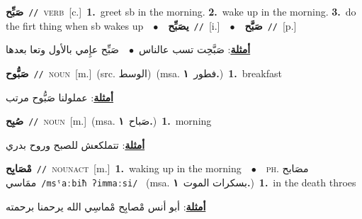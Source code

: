 \documentclass[10pt,a4paper,twoside]{article} %
\begin{document}
\begin{multicols}{2}
{{{{{\setlength\topsep{0pt}\textbf{\foreignlanguage{arabic}{صَبِّح}}\ {\color{gray}\texttt{//}\color{black}}\ \textsc{verb}\ [c.]\ \textbf{1.}~greet sb in the morning.  \textbf{2.}~wake up in the morning.  \textbf{3.}~do the firt thing when sb wakes up\ \ $\bullet$\ \ \setlength\topsep{0pt}\textbf{\foreignlanguage{arabic}{يصَبِّح}}\ {\color{gray}\texttt{//}\color{black}}\ [i.]\ \ $\bullet$\ \ \setlength\topsep{0pt}\textbf{\foreignlanguage{arabic}{صَبَّح}}\ {\color{gray}\texttt{//}\color{black}}\ [p.]\  \begin{flushright}\color{gray}\foreignlanguage{arabic}{\textbf{\underline{\foreignlanguage{arabic}{أمثلة}}}: صَبَّحِت تسب عالناس\ $\bullet$\ \  صَبِّح عإِمي بالأول وتعا بعدها}\end{flushright}\color{black}} \vspace{2mm}

{\setlength\topsep{0pt}\textbf{\foreignlanguage{arabic}{صَبُّوح}}\ {\color{gray}\texttt{//}\color{black}}\ \textsc{noun}\ [m.]\ (src. \color{gray}\foreignlanguage{arabic}{الوسط}\color{black})\ \color{gray}(msa. \foreignlanguage{arabic}{فطور}~\foreignlanguage{arabic}{\textbf{١.}})\color{black}\ \textbf{1.}~breakfast\  \begin{flushright}\color{gray}\foreignlanguage{arabic}{\textbf{\underline{\foreignlanguage{arabic}{أمثلة}}}: عملولنا صَبُّوح  مرتب}\end{flushright}\color{black}} \vspace{2mm}

{\setlength\topsep{0pt}\textbf{\foreignlanguage{arabic}{صُبِح}}\ {\color{gray}\texttt{//}\color{black}}\ \textsc{noun}\ [m.]\ \color{gray}(msa. \foreignlanguage{arabic}{صَباح}~\foreignlanguage{arabic}{\textbf{١.}})\color{black}\ \textbf{1.}~morning\  \begin{flushright}\color{gray}\foreignlanguage{arabic}{\textbf{\underline{\foreignlanguage{arabic}{أمثلة}}}: تتملكعش للصبح وروح بدري}\end{flushright}\color{black}} \vspace{2mm}

{\setlength\topsep{0pt}\textbf{\foreignlanguage{arabic}{مْصَابِح}}\ {\color{gray}\texttt{//}\color{black}}\ \textsc{noun\textunderscore act}\ [m.]\ \textbf{1.}~waking up in the morning\ \ $\bullet$\ \ \textsc{ph.} \color{gray} \foreignlanguage{arabic}{مصَابح ممَاسي}\color{black}\ {\color{gray}\texttt{/{\sffamily msˤaːbiħ ʔimmaːsi}/}\color{black}}\ \color{gray} (msa. \foreignlanguage{arabic}{بسكرات الموت}~\foreignlanguage{arabic}{\textbf{١.}})\color{black}\ \textbf{1.}~in the death throes\  \begin{flushright}\color{gray}\foreignlanguage{arabic}{\textbf{\underline{\foreignlanguage{arabic}{أمثلة}}}: أبو أنس مْصابِح مْماسِي الله يرحمنا برحمته}\end{flushright}\color{black}} \vspace{2mm}

}}}}
\end{multicols}
\end{document}
